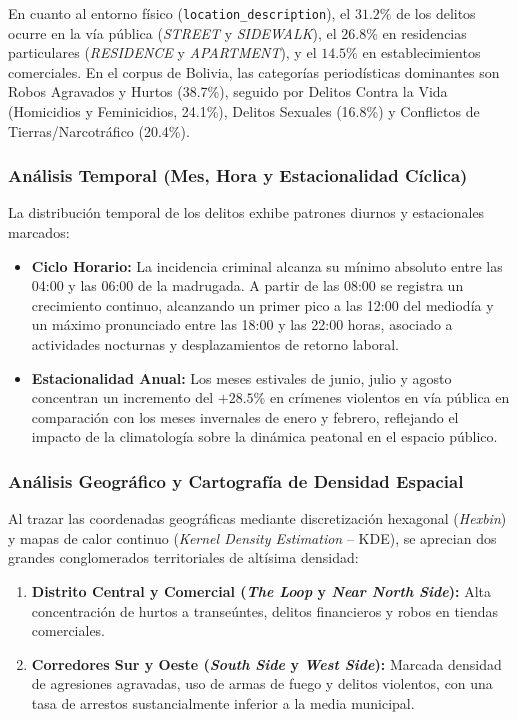 En cuanto al entorno físico (\texttt{location\_description}), el $31.2\%$ de los delitos ocurre en la vía pública (\textit{STREET} y \textit{SIDEWALK}), el $26.8\%$ en residencias particulares (\textit{RESIDENCE} y \textit{APARTMENT}), y el $14.5\%$ en establecimientos comerciales. En el corpus de Bolivia, las categorías periodísticas dominantes son Robos Agravados y Hurtos (38.7\%), seguido por Delitos Contra la Vida (Homicidios y Feminicidios, 24.1\%), Delitos Sexuales (16.8\%) y Conflictos de Tierras/Narcotráfico (20.4\%).

\subsubsection{Análisis Temporal (Mes, Hora y Estacionalidad Cíclica)}

La distribución temporal de los delitos exhibe patrones diurnos y estacionales marcados:
\begin{itemize}
    \item \textbf{Ciclo Horario:} La incidencia criminal alcanza su mínimo absoluto entre las 04:00 y las 06:00 de la madrugada. A partir de las 08:00 se registra un crecimiento continuo, alcanzando un primer pico a las 12:00 del mediodía y un máximo pronunciado entre las 18:00 y las 22:00 horas, asociado a actividades nocturnas y desplazamientos de retorno laboral.
    \item \textbf{Estacionalidad Anual:} Los meses estivales de junio, julio y agosto concentran un incremento del $+28.5\%$ en crímenes violentos en vía pública en comparación con los meses invernales de enero y febrero, reflejando el impacto de la climatología sobre la dinámica peatonal en el espacio público.
\end{itemize}

\subsubsection{Análisis Geográfico y Cartografía de Densidad Espacial}

Al trazar las coordenadas geográficas mediante discretización hexagonal (\textit{Hexbin}) y mapas de calor continuo (\textit{Kernel Density Estimation} -- KDE), se aprecian dos grandes conglomerados territoriales de altísima densidad:
\begin{enumerate}
    \item \textbf{Distrito Central y Comercial (\textit{The Loop} y \textit{Near North Side}):} Alta concentración de hurtos a transeúntes, delitos financieros y robos en tiendas comerciales.
    \item \textbf{Corredores Sur y Oeste (\textit{South Side} y \textit{West Side}):} Marcada densidad de agresiones agravadas, uso de armas de fuego y delitos violentos, con una tasa de arrestos sustancialmente inferior a la media municipal.
\end{enumerate}

